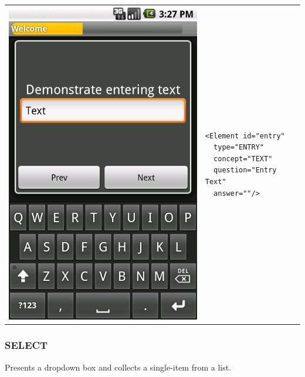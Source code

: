 \documentclass[a4paper,10pt]{article}
\begin{document}
\noindent\begin{tabular}{ p{3.5cm}  p{7.5cm} }
\includegraphics[scale=0.2,keepaspectratio=true]{client_entry_value.png}
& \begin{verbatim}<Element id="entry"
  type="ENTRY" 
  concept="TEXT"
  question="Entry Text"  
  answer=""/>\end{verbatim}
\end{tabular}

\subsubsection{SELECT} Presents a dropdown box and collects a single-item from a
list.
\end{document}

